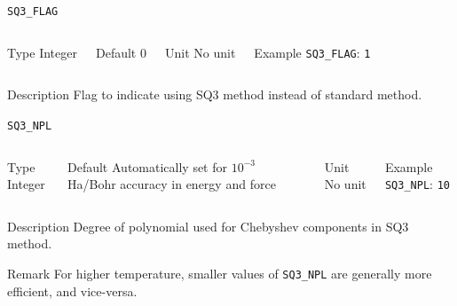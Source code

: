 \begin{frame}[allowframebreaks]{\texttt{SQ3\_FLAG}} \label{SQ3_FLAG}
\vspace*{-12pt}
\begin{columns}
\begin{block}{Type}
Integer
\end{block}

\begin{block}{Default}
0
\end{block}

\begin{block}{Unit}
No unit
\end{block}

\begin{block}{Example}
\texttt{SQ3\_FLAG}: \texttt{1}
\end{block}
\end{columns}

\begin{block}{Description}
Flag to indicate using SQ3 method instead of standard method.
\end{block}

\end{frame}



\begin{frame}[allowframebreaks]{\texttt{SQ3\_NPL}} \label{SQ3_NPL}
\vspace*{-12pt}
\begin{columns}
\begin{block}{Type}
Integer
\end{block}

\begin{block}{Default}
Automatically set for $10^{-3}$ Ha/Bohr accuracy in energy and force
\end{block}

\begin{block}{Unit}
No unit
\end{block}

\begin{block}{Example}
\texttt{SQ3\_NPL}: \texttt{10}
\end{block}
\end{columns}

\begin{block}{Description}
Degree of polynomial used for Chebyshev components in SQ3 method.
\end{block}

\begin{block}{Remark}
For higher temperature, smaller values of \texttt{SQ3\_NPL} are generally more efficient, and vice-versa.
\end{block}

\end{frame}


